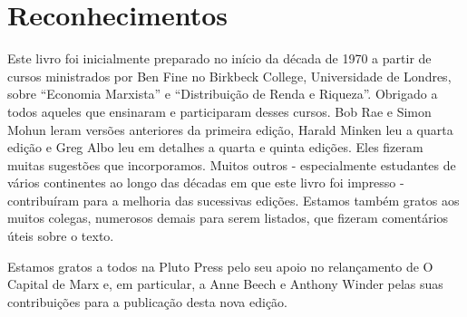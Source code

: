 \chapter{Reconhecimentos}\label{Reconhecimentos}
 \par 
Este livro foi inicialmente preparado no início da década de 1970 a partir de cursos ministrados por Ben Fine no Birkbeck College, Universidade de Londres, sobre “Economia Marxista” e “Distribuição de Renda e Riqueza”. Obrigado a todos aqueles que ensinaram e participaram desses cursos. Bob Rae e Simon Mohun leram versões anteriores da primeira edição, Harald Minken leu a quarta edição e Greg Albo leu em detalhes a quarta e quinta edições. Eles fizeram muitas sugestões que incorporamos. Muitos outros - especialmente estudantes de vários continentes ao longo das décadas em que este livro foi impresso - contribuíram para a melhoria das sucessivas edições. Estamos também gratos aos muitos colegas, numerosos demais para serem listados, que fizeram comentários úteis sobre o texto.
 \par 
Estamos gratos a todos na Pluto Press pelo seu apoio no relançamento de O Capital de Marx e, em particular, a Anne Beech e Anthony Winder pelas suas contribuições para a publicação desta nova edição.